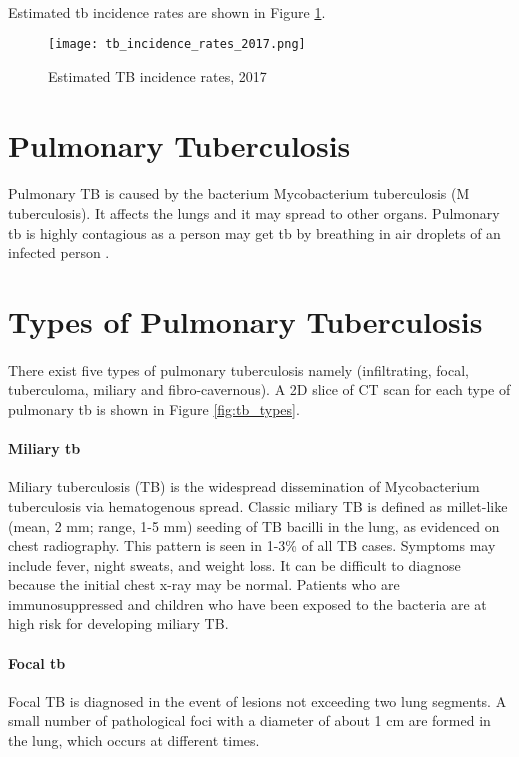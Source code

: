 \paragraph{}
Estimated \ac{tb} incidence rates are shown in Figure \ref{tb_incidence_rates_2017}.
\begin{figure}[ht]
 \texttt{[image: tb\_incidence\_rates\_2017.png]}
 \caption{Estimated TB incidence rates, 2017 \cite{TBT:3}}
 \label{tb_incidence_rates_2017}
\end{figure}
\section{Pulmonary Tuberculosis}
\paragraph{}
Pulmonary TB is caused by the bacterium Mycobacterium tuberculosis (M tuberculosis). It affects the lungs and it may spread to other organs. Pulmonary \ac{tb} is highly contagious as a person may get \ac{tb} by breathing in air droplets of an infected person \cite{TBT:4}.
\section{Types of Pulmonary Tuberculosis}
\paragraph{}
There exist five types of pulmonary tuberculosis namely (infiltrating, focal, tuberculoma, miliary and fibro-cavernous). A 2D slice of CT scan for each type of pulmonary \ac{tb} is shown in Figure \ref{fig:tb_types}.
\paragraph{Miliary \ac{tb}}
Miliary tuberculosis (TB) is the widespread dissemination of Mycobacterium tuberculosis via hematogenous spread. Classic miliary TB is defined as millet-like (mean, 2 mm; range, 1-5 mm) seeding of TB bacilli in the lung, as evidenced on chest radiography. This pattern is seen in 1-3\% of all TB cases.
Symptoms may include fever, night sweats, and weight loss. It can be difficult to diagnose because the initial chest x-ray may be normal. Patients who are immunosuppressed and children who have been exposed to the bacteria are at high risk for developing miliary TB.\cite{TBMIL:1,TBMIL:2,TBMIL:3, TBMIL:4}
\paragraph{Focal \ac{tb}}
Focal TB is diagnosed in the event of lesions not exceeding two lung segments. A small number of pathological foci with a diameter of about 1 cm are formed in the lung, which occurs at different times.\cite{TBFOC:1}
